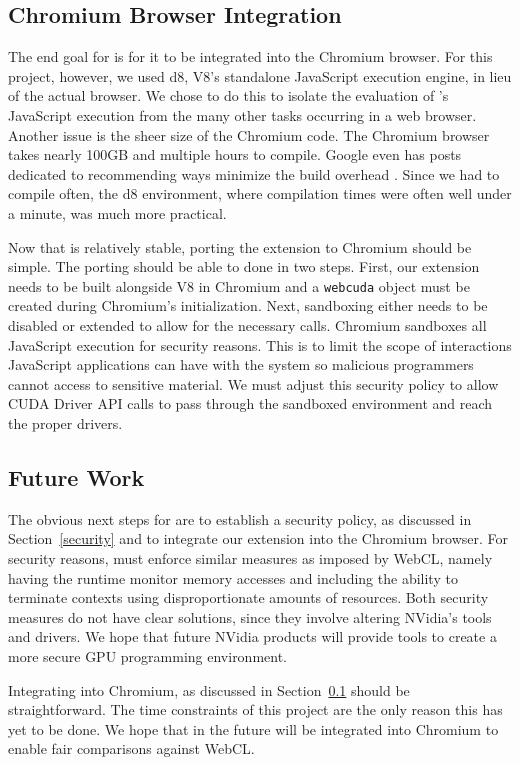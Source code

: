\subsection{Chromium Browser Integration} 
\label{chromeIntegration}
The end goal for \name is for it to be integrated into the
Chromium browser. For this project, however, we used d8, V8's standalone
JavaScript execution engine, in lieu of the actual browser. We chose to do this
to isolate the evaluation of \namens's JavaScript execution from the many other
tasks occurring in a web browser.  Another issue is the sheer size of the Chromium code.
The Chromium browser takes nearly 100GB and multiple hours to compile. Google
even has 
posts dedicated to recommending ways minimize the build overhead
\cite{linuxfasterbuilds}.  Since we had to compile often, the d8 environment,
where compilation times were often well under a minute, was much more practical.

Now that \name is relatively stable, porting the extension to Chromium should be
simple. The porting should be able to done in two steps. First, our extension
needs to be built alongside V8 in Chromium and a \texttt{webcuda} object must be
created during Chromium's initialization.  Next, sandboxing either needs to be
disabled or extended to allow for the necessary \name calls. Chromium sandboxes
all JavaScript execution for security reasons. This is to limit the scope of
interactions JavaScript applications can have with the system so malicious
programmers cannot access to sensitive material. We must adjust this security
policy to allow CUDA Driver API calls to pass through the sandboxed environment
and reach the proper drivers. 


\subsection{Future Work}
\label{future}
The obvious next steps for \name are to establish a security policy, as
discussed in Section~\ref{security} and to integrate our extension into the
Chromium browser. For security reasons, \name must enforce similar measures as
imposed by WebCL, namely having the runtime monitor memory accesses and
including the ability to terminate contexts using disproportionate amounts of
resources. Both security measures do not have clear solutions, since they involve
altering NVidia's tools and drivers. We hope that future NVidia products will
provide tools to create a more secure GPU programming environment.

Integrating \name into Chromium, as discussed in Section~\ref{chromeIntegration} should be
straightforward. The time constraints of this project are the only reason this
has yet to be done. We hope that in the future \name will be integrated into
Chromium to enable fair comparisons against WebCL.

